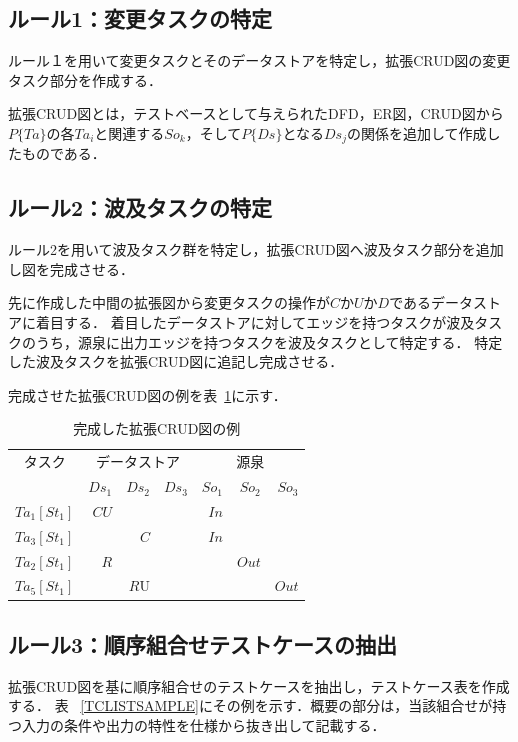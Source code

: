 \documentclass[a4paper,10pt]{jreport}
\begin{document}
\subsection{ルール1：変更タスクの特定}
ルール１を用いて変更タスクとそのデータストアを特定し，拡張CRUD図の変更タスク部分を作成する．

拡張CRUD図とは，テストベースとして与えられたDFD，ER図，CRUD図から$P\{Ta\}$の各$Ta_i$と関連する$So_k$，そして$P\{Ds\}$となる$Ds_j$の関係を追加して作成したものである．


\subsection{ルール2：波及タスクの特定}
ルール2を用いて波及タスク群を特定し，拡張CRUD図へ波及タスク部分を追加し図を完成させる．

先に作成した中間の拡張図から変更タスクの操作が$C$か$U$か$D$であるデータストアに着目する．
着目したデータストアに対してエッジを持つタスクが波及タスクのうち，源泉に出力エッジを持つタスクを波及タスクとして特定する．
特定した波及タスクを拡張CRUD図に追記し完成させる．

完成させた拡張CRUD図の例を表~\ref{excrud}に示す．
\begin{table}[t]
  \centering
  \caption{完成した拡張CRUD図の例}
    \begin{tabular}{r|r|r|r|r|r|r}
    \multicolumn{1}{c|}{タスク} & \multicolumn{3}{c|}{データストア} & \multicolumn{3}{c}{源泉} \\
\cline{2-7}    \multicolumn{1}{c|}{} & $Ds_1$ & $Ds_2$ & $Ds_3$ & $So_1$ & $So_2$ & $So_3$ \\
    \hline
    \hline
    $Ta_1[St_1]$ & $CU$ &   &   & $In$ &   &  \\
    \hline
    $Ta_3[St_1]$ &   & $C$ &   & $In$ &   &  \\
    \hline
    $Ta_2[St_1]$ & $R$ &   &   &   & $Out$ &  \\
    \hline
    $Ta_5[St_1]$ &   & $R$U &   &   &   & $Out$ \\
    \end{tabular}%
  \label{excrud}%
\end{table}%

\subsection{ルール3：順序組合せテストケースの抽出}
拡張CRUD図を基に順序組合せのテストケースを抽出し，テストケース表を作成する．
表 ~\ref{TCLISTSAMPLE}にその例を示す．概要の部分は，当該組合せが持つ入力の条件や出力の特性を仕様から抜き出して記載する．
\end{document}

